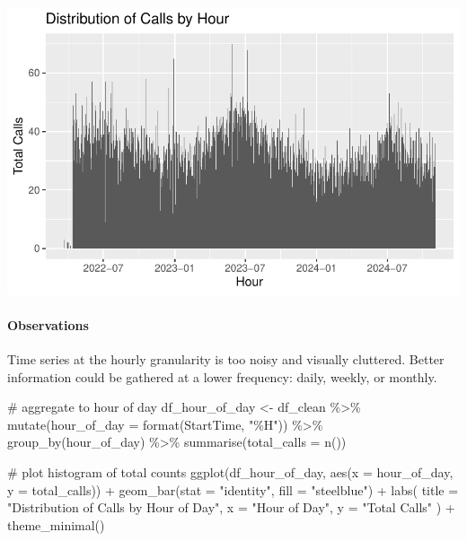 \documentclass[
  letterpaper,
  DIV=11,
  numbers=noendperiod]{scrartcl}
\let\oldparagraph\paragraph
\renewcommand{\paragraph}[1]{\oldparagraph{#1}\mbox{}}
\newenvironment{Shaded}{\begin{snugshade}}{\end{snugshade}}
\newcommand{\AttributeTok}[1]{\textcolor[rgb]{0.40,0.45,0.13}{#1}}
\newcommand{\CommentTok}[1]{\textcolor[rgb]{0.37,0.37,0.37}{#1}}
\newcommand{\FunctionTok}[1]{\textcolor[rgb]{0.28,0.35,0.67}{#1}}
\newcommand{\NormalTok}[1]{\textcolor[rgb]{0.00,0.23,0.31}{#1}}
\newcommand{\OtherTok}[1]{\textcolor[rgb]{0.00,0.23,0.31}{#1}}
\newcommand{\SpecialCharTok}[1]{\textcolor[rgb]{0.37,0.37,0.37}{#1}}
\newcommand{\StringTok}[1]{\textcolor[rgb]{0.13,0.47,0.30}{#1}}
\begin{document}
\includegraphics{final_proj_group1_files/figure-pdf/hourly-2.pdf}

\paragraph{Observations}\label{observations-2}

Time series at the hourly granularity is too noisy and visually
cluttered. Better information could be gathered at a lower frequency:
daily, weekly, or monthly.

\begin{Shaded}
\begin{Highlighting}[]
\CommentTok{\# aggregate to hour of day}
\NormalTok{df\_hour\_of\_day }\OtherTok{\textless{}{-}}\NormalTok{ df\_clean }\SpecialCharTok{\%\textgreater{}\%}
  \FunctionTok{mutate}\NormalTok{(}\AttributeTok{hour\_of\_day =} \FunctionTok{format}\NormalTok{(StartTime, }\StringTok{"\%H"}\NormalTok{)) }\SpecialCharTok{\%\textgreater{}\%}
  \FunctionTok{group\_by}\NormalTok{(hour\_of\_day) }\SpecialCharTok{\%\textgreater{}\%}
  \FunctionTok{summarise}\NormalTok{(}\AttributeTok{total\_calls =} \FunctionTok{n}\NormalTok{())}

\CommentTok{\# plot histogram of total counts}
\FunctionTok{ggplot}\NormalTok{(df\_hour\_of\_day, }\FunctionTok{aes}\NormalTok{(}\AttributeTok{x =}\NormalTok{ hour\_of\_day, }\AttributeTok{y =}\NormalTok{ total\_calls)) }\SpecialCharTok{+}
  \FunctionTok{geom\_bar}\NormalTok{(}\AttributeTok{stat =} \StringTok{"identity"}\NormalTok{, }\AttributeTok{fill =} \StringTok{"steelblue"}\NormalTok{) }\SpecialCharTok{+} 
  \FunctionTok{labs}\NormalTok{(}
    \AttributeTok{title =} \StringTok{"Distribution of Calls by Hour of Day"}\NormalTok{, }
    \AttributeTok{x =} \StringTok{"Hour of Day"}\NormalTok{, }
    \AttributeTok{y =} \StringTok{"Total Calls"}
\NormalTok{  ) }\SpecialCharTok{+}
  \FunctionTok{theme\_minimal}\NormalTok{()}
\end{Highlighting}
\end{Shaded}
\end{document}
